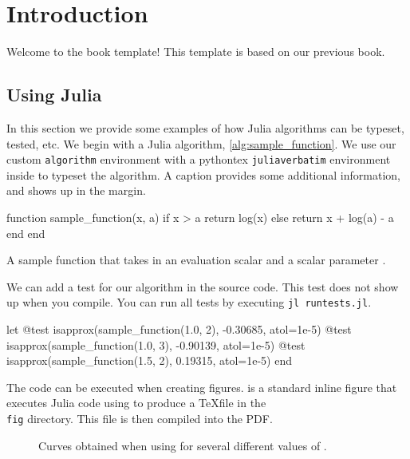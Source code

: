 \chapter{Introduction}
\label{ch:introduction}

Welcome to the book template!
This template is based on our previous book.\cite{Kochenderfer2019}

\section{Using Julia}

In this section we provide some examples of how Julia algorithms can be typeset, tested, etc.
We begin with a Julia algorithm, \cref{alg:sample_function}.
We use our custom \texttt{algorithm} environment with a pythontex \texttt{juliaverbatim} environment inside to typeset the algorithm.
A caption provides some additional information, and shows up in the margin.

\begin{algorithm}
\begin{juliaverbatim}
function sample_function(x, a)
	if x > a
		return log(x)
	else
		return x + log(a) - a
	end
end
\end{juliaverbatim}
\caption{
	\label{alg:sample_function}
	A sample function that takes in an evaluation scalar  and a scalar parameter .
}
\end{algorithm}

We can add a test for our algorithm in the source code.
This test does not show up when you compile.
You can run all tests by executing \texttt{jl runtests.jl}.

\begin{juliatest}
let
	@test isapprox(sample_function(1.0, 2), -0.30685, atol=1e-5)
	@test isapprox(sample_function(1.0, 3), -0.90139, atol=1e-5)
	@test isapprox(sample_function(1.5, 2), 0.19315, atol=1e-5)
end
\end{juliatest}

The code can be executed when creating figures.
 is a standard inline figure that executes Julia code using  to produce a \TeX file in the \texttt{\\fig} directory.
This file is then compiled into the PDF.

\begin{figure}
	\begin{center}
	\end{center}
	\caption{
		\label{fig:sample_function}
		Curves obtained when using  for several different values of .
	}
\end{figure}

